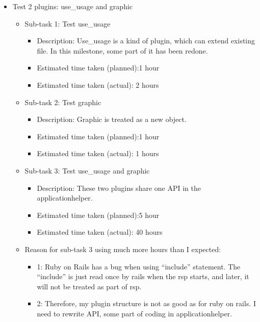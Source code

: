 \documentclass{article}
\begin{document}
\begin{itemize}
    \item Test 2 plugins: use\_usage and graphic
        \begin{itemize}
            \item Sub-task 1: Test use\_usage
                \begin{itemize}
                    \item Description:  Use\_usage is a kind of plugin, which can extend existing file. In this milestone, some part of it has been redone. 
                    \item Estimated time taken (planned):1 hour
                    \item Estimated time taken (actual): 2 hours
                \end{itemize}
            \item Sub-task 2: Test graphic
                \begin{itemize}
                    \item Description:  Graphic is treated as a new object.
                    \item Estimated time taken (planned):1 hour
                    \item Estimated time taken (actual): 1 hours
                \end{itemize}
            \item Sub-task 3: Test use\_usage and graphic
                \begin{itemize}
                    \item Description: These two plugins share one API in the applicationhelper.
                    \item Estimated time taken (planned):5 hour
                    \item Estimated time taken (actual): 40 hours
                \end{itemize}
            \item Reason for sub-task 3 using much more hours than I expected:
                \begin{itemize}
                    \item 1: Ruby on Rails has a bug when using ``include'' statement. The ``include'' is just read once by rails when the rsp starts, and later, it will not be treated as part of rsp.
                    \item 2: Therefore, my plugin structure is not as good as for ruby on rails. I need to rewrite	API, some part of coding in applicationhelper.

\end{itemize}
\end{itemize}
\end{itemize}
\end{document}
